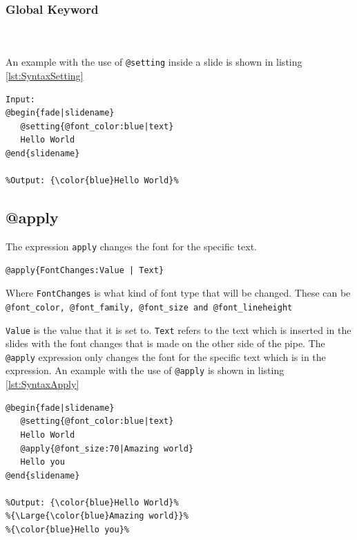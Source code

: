{{\subsubsection*{Global Keyword}
\\ \\
An example with the use of \lstinline!@setting! inside a slide is shown in listing \ref{lst:SyntaxSetting}

\begin{lstlisting}[frame=single, caption=Hello World with setting, label=lst:SyntaxSetting]
Input:
@begin{fade|slidename}
   @setting{@font_color:blue|text}
   Hello World
@end{slidename}

%Output: {\color{blue}Hello World}%
\end{lstlisting}

\subsection{@apply}
The expression \texttt{apply} changes the font for the specific text.
\begin{lstlisting}[frame=single, caption=Generic \texttt{apply} expression example]
@apply{FontChanges:Value | Text}
\end{lstlisting}
Where \texttt{FontChanges} is what kind of font type that will be changed. These can be \lstinline!@font_color, @font_family, @font_size and @font_lineheight!

\texttt{Value} is the value that it is set to.
\texttt{Text} refers to the text which is inserted in the slides with the font changes that is made on the other side of the pipe.
The \lstinline!@apply! expression only changes the font for the specific text which is in the expression.
An example with the use of \lstinline!@apply! is shown in listing \ref{lst:SyntaxApply}
\newpage
\begin{lstlisting}[frame=single, caption=Hello World with apply, label=lst:SyntaxApply]
@begin{fade|slidename}
   @setting{@font_color:blue|text}
   Hello World
   @apply{@font_size:70|Amazing world}
   Hello you
@end{slidename}

%Output: {\color{blue}Hello World}%
%{\Large{\color{blue}Amazing world}}%
%{\color{blue}Hello you}%
\end{lstlisting}

}}
